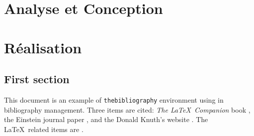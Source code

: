 \documentclass[12pt,twoside]{report}
\theoremstyle{plain}
\newcommand{\comment}[1]{}
\theoremstyle{definition}
\theoremstyle{Remarque}
\begin{document}


\chapter{Analyse et Conception}


 
 \chapter{Réalisation }
 
 
 
  
  
  
  
  \section{First section}
  
  This document is an example of \texttt{thebibliography} environment using 
  in bibliography management. Three items are cited: \textit{The \LaTeX\ Companion} 
  book \cite{latexcompanion}, the Einstein journal paper \parencite{einstein}, and the 
  Donald Knuth's website \cite{knuthwebsite}. The \LaTeX\ related items are
  \cite{latexcompanion,knuthwebsite}. 
  
  \medskip
  \comment{
  \begin{thebibliography}{9}
  	\bibitem{latexcompanion} 
  	Michel Goossens, Frank Mittelbach, and Alexander Samarin. 
  	\textit{The \LaTeX\ Companion}. 
  	Addison-Wesley, Reading, Massachusetts, 1993.
  	
  	\bibitem{einstein} 
  	Albert Einstein. 
  	\textit{Zur Elektrodynamik bewegter K{\"o}rper}. (German) 
  	[\textit{On the electrodynamics of moving bodies}]. 
  	Annalen der Physik, 322(10):891–921, 1905.
  	
  	\bibitem{knuthwebsite} 
  	Knuth: Computers and Typesetting,
  	\\\texttt{http://www-cs-faculty.stanford.edu/\~{}uno/abcde.html}
  \end{thebibliography}
  
  \printbibliography[type=article,title={Articles only}]
  \printbibliography[type=book,title={Books only}]
  
  \printbibliography[keyword={physics},title={Physics-related only}]
  \printbibliography[keyword={latex},title={\LaTeX-related only}]
}
\appendix

 
\end{document}
